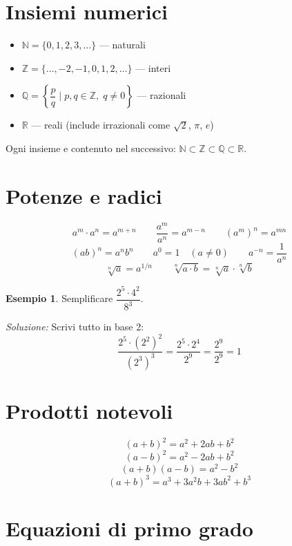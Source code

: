 \documentclass[12pt, a4paper, twoside, openright]{book}
\theoremstyle{definition}
\newtheorem{esempio}{Esempio}[section]
\newcommand{\R}{\mathbb{R}}
\newcommand{\N}{\mathbb{N}}
\newcommand{\Z}{\mathbb{Z}}
\newcommand{\Q}{\mathbb{Q}}
\begin{document}
\section{Insiemi numerici}

\begin{defbox}
\begin{itemize}
  \item $\N = \{0, 1, 2, 3, \ldots\}$ --- naturali
  \item $\Z = \{\ldots, -2, -1, 0, 1, 2, \ldots\}$ --- interi
  \item $\Q = \left\{\dfrac{p}{q} \mid p,q \in \Z,\; q \neq 0\right\}$ --- razionali
  \item $\R$ --- reali (include irrazionali come $\sqrt{2}$, $\pi$, $e$)
\end{itemize}
Ogni insieme e contenuto nel successivo: $\N \subset \Z \subset \Q \subset \R$.
\end{defbox}

\section{Potenze e radici}

\begin{formulario}
\[
a^m \cdot a^n = a^{m+n} \qquad
\frac{a^m}{a^n} = a^{m-n} \qquad
(a^m)^n = a^{mn}
\]
\[
(ab)^n = a^n b^n \qquad
a^0 = 1 \quad (a \neq 0) \qquad
a^{-n} = \frac{1}{a^n}
\]
\[
\sqrt[n]{a} = a^{1/n} \qquad
\sqrt[n]{a \cdot b} = \sqrt[n]{a} \cdot \sqrt[n]{b}
\]
\end{formulario}

\begin{esempio}
Semplificare $\dfrac{2^5 \cdot 4^2}{8^3}$.

\textit{Soluzione:} Scrivi tutto in base 2:
\[
\frac{2^5 \cdot (2^2)^2}{(2^3)^3} = \frac{2^5 \cdot 2^4}{2^9} = \frac{2^9}{2^9} = 1
\]
\end{esempio}

\section{Prodotti notevoli}

\begin{formulario}
\[
(a+b)^2 = a^2 + 2ab + b^2
\]
\[
(a-b)^2 = a^2 - 2ab + b^2
\]
\[
(a+b)(a-b) = a^2 - b^2
\]
\[
(a+b)^3 = a^3 + 3a^2b + 3ab^2 + b^3
\]
\end{formulario}

\section{Equazioni di primo grado}
\end{document}
